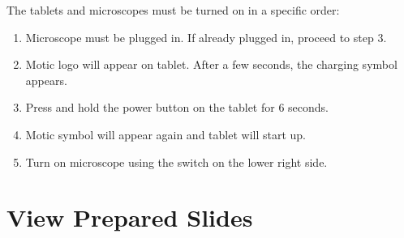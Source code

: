 The tablets and microscopes must be turned on in a specific order:

\begin{enumerate}
\def\labelenumi{\arabic{enumi}.}
\tightlist
\item
  Microscope must be plugged in. If already plugged in, proceed to step
  3.
\item
  Motic logo will appear on tablet. After a few seconds, the charging
  symbol appears.
\item
  Press and hold the power button on the tablet for 6 seconds.
\item
  Motic symbol will appear again and tablet will start up.
\item
  Turn on microscope using the switch on the lower right side.
\end{enumerate}

\section{View Prepared Slides}\label{view-prepared-slides}

